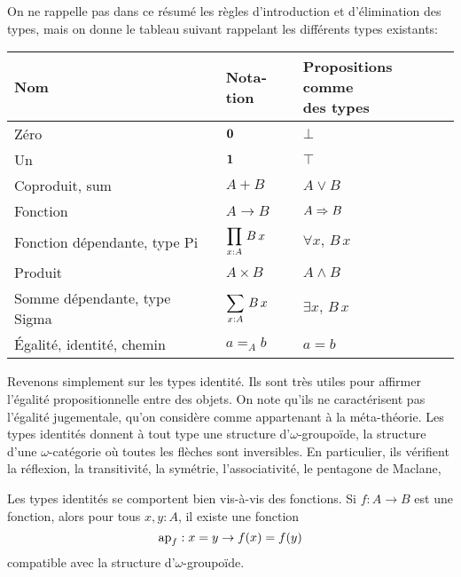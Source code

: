 \begin{otherlanguage}{french}
On ne rappelle pas dans ce résumé les règles d'introduction et
d'élimination des types, mais on donne le tableau suivant rappelant
les différents types existants:

\renewcommand{\arraystretch}{2}
 
\begin{tabular}{|l|l|l|}
  \hline
  Nom & Notation & \shortstack{Propositions comme \\ des types} \\
  \hline\hline
  Zéro & $\displaystyle{\mathbf{0}}$ & $\displaystyle{\bot}$ \\
  \hline
  Un & $\displaystyle{\mathbf{1}}$ & $\displaystyle{\top}$ \\
  \hline
  Coproduit, sum & $\displaystyle{A+B}$ & $\displaystyle{A\lor B}$ \\
  \hline
  Fonction & $\displaystyle{A\to B}$ & $\displaystyle{A\Rightarrow B}$ \\
  \hline
  Fonction dépendante, type Pi & $\displaystyle{\prod_{x:A}\, B\, x}$ & $\displaystyle{\forall x,\,
                                                       B\, x}$ \\
  \hline
  Produit & $\displaystyle{A\times B}$ & $\displaystyle{A\land B}$ \\
  \hline
  Somme dépendante, type Sigma & $\displaystyle{\sum_{x:A}\, B\, x}$ & $\displaystyle{\exists x,\, B\,
                                                    x}$ \\
  \hline
  Égalité, identité, chemin & $\displaystyle{a =_A b}$ & $\displaystyle{a = b}$
  \\
  \hline
\end{tabular}
\renewcommand{\arraystretch}{1}

Revenons simplement sur les types identité. Ils sont très utiles pour
affirmer l'égalité propositionnelle entre des objets. On note qu'ils
ne caractérisent pas l'égalité jugementale, qu'on considère comme
appartenant à la méta-théorie. Les types identités donnent à tout type
une structure d'$\omega$-groupoïde, \ie{} la structure d'une
$\omega$-catégorie où toutes les flèches sont inversibles. En
particulier, ils vérifient la réflexion, la transitivité, la symétrie,
l'associativité, le pentagone de Maclane, \etc{}

Les types identités se comportent bien vis-à-vis des fonctions. Si
$f:A\to B$ est une fonction, alors pour tous $x,y:A$, il existe une
fonction 
\[\mathrm{ap}_{f}: x=y \to f(x) = f(y)\]
compatible avec la structure d'$\omega$-groupoïde. 


\end{otherlanguage}
